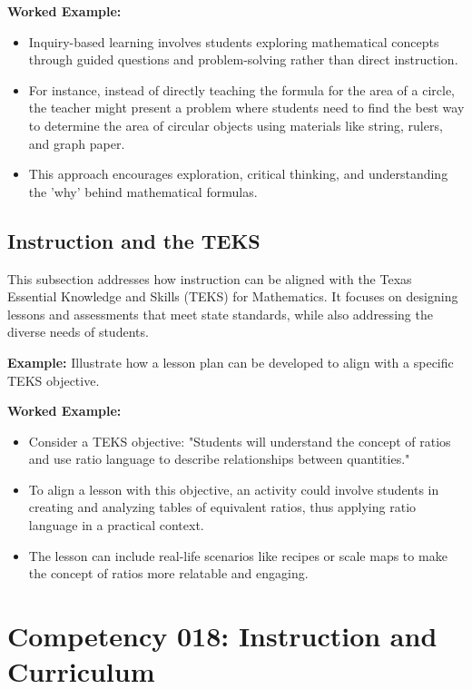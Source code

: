 \documentclass{book}
\begin{document}
\textbf{Worked Example:}
\begin{itemize}
        \item Inquiry-based learning involves students exploring mathematical concepts through guided questions and problem-solving rather than direct instruction.
        \item For instance, instead of directly teaching the formula for the area of a circle, the teacher might present a problem where students need to find the best way to determine the area of circular objects using materials like string, rulers, and graph paper.
        \item This approach encourages exploration, critical thinking, and understanding the 'why' behind mathematical formulas.
\end{itemize}


\subsection{Instruction and the TEKS}
This subsection addresses how instruction can be aligned with the Texas Essential Knowledge and Skills (TEKS) for Mathematics. It focuses on designing lessons and assessments that meet state standards, while also addressing the diverse needs of students.


\textbf{Example:} Illustrate how a lesson plan can be developed to align with a specific TEKS objective.


\textbf{Worked Example:}
\begin{itemize}
        \item Consider a TEKS objective: "Students will understand the concept of ratios and use ratio language to describe relationships between quantities."
        \item To align a lesson with this objective, an activity could involve students in creating and analyzing tables of equivalent ratios, thus applying ratio language in a practical context.
        \item The lesson can include real-life scenarios like recipes or scale maps to make the concept of ratios more relatable and engaging.
\end{itemize}



\section{Competency 018: Instruction and Curriculum}
\end{document}
